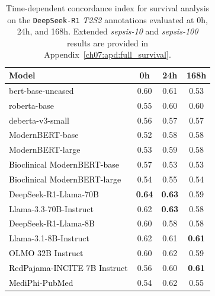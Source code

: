 \begin{table}[htbp]
\caption{
Time-dependent concordance index for survival analysis on the \texttt{DeepSeek-R1} \textit{T2S2} annotations evaluated at 0h, 24h, and 168h. Extended \textit{sepsis-10} and \textit{sepsis-100} results are provided in Appendix~\ref{ch07:apd:full_survival}.
}
\ChSevenTableBodyStart
\begin{ChSevenFloatBody}

\centering
{
\begin{tabular}{lccc}
\toprule
\textbf{Model} & 0h & 24h & 168h \\
\midrule
bert-base-uncased       & 0.60 & 0.61 & 0.53 \\
roberta-base            & 0.55 & 0.60 & 0.60 \\
deberta-v3-small        & 0.56 & 0.57 & 0.57 \\
ModernBERT-base         & 0.52 & 0.58 & 0.58 \\
ModernBERT-large        & 0.53 & 0.59 & 0.58 \\
\textcolor{black}{Bioclinical ModernBERT-base} & 0.57 & 0.53 & 0.53 \\
\textcolor{black}{Bioclinical ModernBERT-large} & 0.54 & 0.55 & 0.54 \\
DeepSeek-R1-Llama-70B   & \textbf{0.64} & \textbf{0.63} & 0.59 \\
Llama-3.3-70B-Instruct  & 0.62 & \textbf{0.63} & 0.58 \\
DeepSeek-R1-Llama-8B    & 0.60 & 0.58 & 0.58 \\
Llama-3.1-8B-Instruct   & 0.62 & 0.61 & \textbf{0.61} \\
\textcolor{black}{OLMO 32B Instruct} & 0.60 & 0.62 & 0.59 \\
\textcolor{black}{RedPajama-INCITE 7B Instruct} & 0.56 & 0.60 & \textbf{0.61} \\
\textcolor{black}{MediPhi-PubMed} & 0.54 & 0.62 & 0.55 \\
\bottomrule
\end{tabular}
}



\end{ChSevenFloatBody}
\end{table}